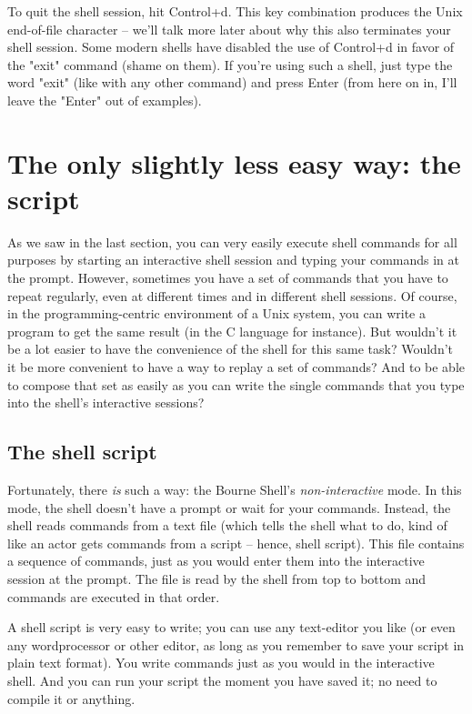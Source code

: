 To quit the shell session, hit Control+d. This key combination produces the
Unix end-of-file character -- we'll talk more later about why this also
terminates your shell session. Some modern shells have disabled the use of
Control+d in favor of the "exit" command (shame on them). If you're using such
a shell, just type the word "exit" (like with any other command) and press
Enter (from here on in, I'll leave the "Enter" out of examples).

\section{The only slightly less easy way: the script}
As we saw in the last section, you can very easily execute shell commands for
all purposes by starting an interactive shell session and typing your commands
in at the prompt. However, sometimes you have a set of commands that you have
to repeat regularly, even at different times and in different shell sessions.
Of course, in the programming-centric environment of a Unix system, you can
write a program to get the same result (in the C language for instance). But
wouldn't it be a lot easier to have the convenience of the shell for this same
task? Wouldn't it be more convenient to have a way to replay a set of commands?
And to be able to compose that set as easily as you can write the single
commands that you type into the shell's interactive sessions?

\subsection{The shell script}
Fortunately, there \textit{is} such a way: the Bourne Shell's
\textit{non-interactive} mode. In this mode, the shell doesn't have a prompt or
wait for your commands. Instead, the shell reads commands from a text file
(which tells the shell what to do, kind of like an actor gets commands from a
script -- hence, shell script). This file contains a sequence of commands, just
as you would enter them into the interactive session at the prompt. The file is
read by the shell from top to bottom and commands are executed in that order.

A shell script is very easy to write; you can use any text-editor you like (or
even any wordprocessor or other editor, as long as you remember to save your
script in plain text format). You write commands just as you would in the
interactive shell. And you can run your script the moment you have saved it; no
need to compile it or anything.

